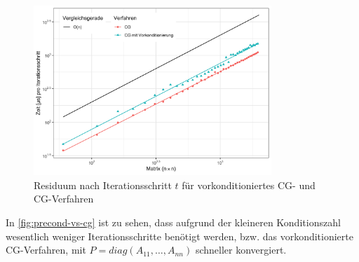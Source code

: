 \documentclass[12pt,a4paper]{scrartcl}
\numberwithin{equation}{section}
\numberwithin{myalgctr}{section}
\numberwithin{mytheoremctr}{subsection}
\numberwithin{mykorollarctr}{subsection}
\numberwithin{mylemmactr}{subsection}
\numberwithin{mybeispielctr}{subsection}
\begin{document}
	\begin{figure}[H]
		\begin{center}
			\includegraphics[width=0.8\textwidth]{../plots/precond-vs-cg-complexity.png}
		\end{center}
		\caption{Residuum nach Iterationsschritt $t$ f\"ur vorkonditioniertes CG- und CG-Verfahren }
		\label{fig:precond-vs-cg-complexity}	
	\end{figure}
	
	In \cref{fig:precond-vs-cg} ist zu sehen, dass aufgrund der kleineren Konditionszahl wesentlich weniger Iterationsschritte benötigt werden, bzw. das vorkonditionierte CG-Verfahren, mit $P = diag(A_{11}, \ldots, A_{nn})$ schneller konvergiert. 
		
\end{document}

